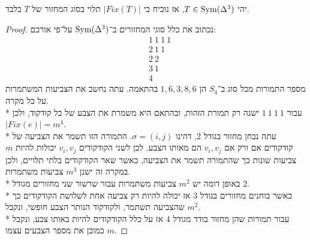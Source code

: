 \begin{proposition}
	יהי $T \in \operatorname{Sym}(\Delta^3)$, אז נוכיח כי $|Fix(T)|$ תלוי בסוג המחזור של $T$ בלבד.
\end{proposition}
\begin{proof}
	נכתוב את כלל סוגי המחזורים ב־$\operatorname{Sym}(\Delta^3)$ על־פי אורכם:
	\begin{align*}
		& 1\ 1\ 1\ 1 \\
		& 2\ 1\ 1 \\
		& 2\ 2 \\
		& 3\ 1 \\
		& 4
	\end{align*}
	מספר התמורות מכל סוג ב־$S_4$ הן $1, 6, 3, 8, 6$ בהתאמה. עתה נחשב את הצביעות המשתמרות על כל מקרה. \\*
	עבור $1\ 1\ 1\ 1$ ישנה רק תמורת הזהות, ובהתאם היא משמרת את הצבע של כל קודקוד, ולכן $|Fix(e)| = m^4$. \\*
	עתה נבחן מחזור בגודל $2$, דהינו $\sigma = (i, j)$. התמורה הזו תשמר את הצביעה של קודקודים אם ורק אם $v_i, v_j$ הם מאותו הצבע.
	לכן לשני הקודקודים $v_i, v_j$ יכולות להיות $m$ צביעות שונות כך שהתמורה תשמר את הצביעה, כאשר שאר הקודקודים בלתי תלויים, ולכן במקרה זה ישנן $m^3$ צביעות משתמרות. \\*
	באופן דומה יש $m^2$ צביעות משתמרות עבור שרשור שני מחזורים מגודל $2$. \\*
	כאשר בוחנים מחזורים בגודל $3$ אז יכולה להיות רק צביעה אחת לשלושת הקודקודים כך שהצביעה תשתמר, ולקודקוד הנותר הצבע חופשי, ונקבל $m^2$. \\*
	עבור תמורות שהן מחזור בודד מגודל $4$ אז על כלל הקודקודים להיות באותו צבע, ונקבל כמובן את מספר הצבעים עצמו $m$.
\end{proof}

